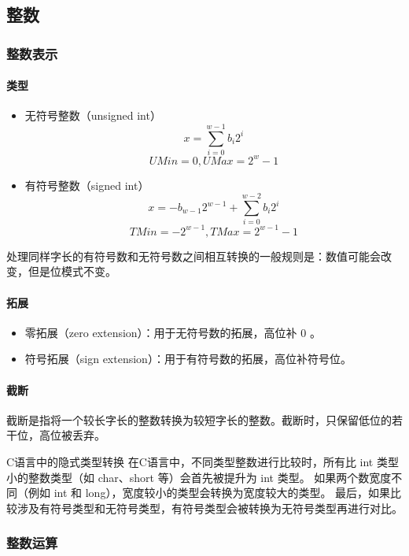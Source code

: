 \subsection{整数}
\subsubsection{整数表示}
\paragraph{类型}
\begin{itemize}
    \item 无符号整数（unsigned int）
          $$x = \sum_{i=0}^{w-1} b_i 2^i$$
          $$UMin = 0, UMax = 2^w - 1$$
    \item 有符号整数（signed int）
          $$x = -b_{w-1} 2^{w-1} + \sum_{i=0}^{w-2} b_i 2^i$$
          $$TMin = -2^{w-1}, TMax = 2^{w-1} - 1$$
\end{itemize}

处理同样字长的有符号数和无符号数之间相互转换的一般规则是：数值可能会改变，但是位模式不变。

\paragraph{拓展}
\begin{itemize}
    \item 零拓展（zero extension）：用于无符号数的拓展，高位补 0 。
    \item 符号拓展（sign extension）：用于有符号数的拓展，高位补符号位。
\end{itemize}
\paragraph{截断}
截断是指将一个较长字长的整数转换为较短字长的整数。截断时，只保留低位的若干位，高位被丢弃。

\begin{sidenote}{C语言中的隐式类型转换}
    在C语言中，不同类型整数进行比较时，所有比 int 类型小的整数类型（如 char、short 等）会首先被提升为 int 类型。
    如果两个数宽度不同（例如 int 和 long），宽度较小的类型会转换为宽度较大的类型。
    最后，如果比较涉及有符号类型和无符号类型，有符号类型会被转换为无符号类型再进行对比。
\end{sidenote}

\subsubsection{整数运算}
